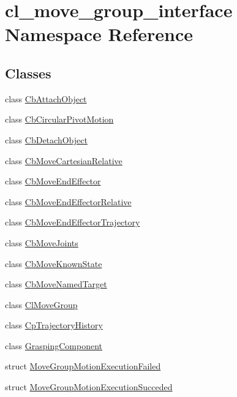 \hypertarget{namespacecl__move__group__interface}{}\section{cl\+\_\+move\+\_\+group\+\_\+interface Namespace Reference}
\label{namespacecl__move__group__interface}
\subsection*{Classes}
\begin{DoxyCompactItemize}
\item 
class \hyperlink{classcl__move__group__interface_1_1CbAttachObject}{Cb\+Attach\+Object}
\item 
class \hyperlink{classcl__move__group__interface_1_1CbCircularPivotMotion}{Cb\+Circular\+Pivot\+Motion}
\item 
class \hyperlink{classcl__move__group__interface_1_1CbDetachObject}{Cb\+Detach\+Object}
\item 
class \hyperlink{classcl__move__group__interface_1_1CbMoveCartesianRelative}{Cb\+Move\+Cartesian\+Relative}
\item 
class \hyperlink{classcl__move__group__interface_1_1CbMoveEndEffector}{Cb\+Move\+End\+Effector}
\item 
class \hyperlink{classcl__move__group__interface_1_1CbMoveEndEffectorRelative}{Cb\+Move\+End\+Effector\+Relative}
\item 
class \hyperlink{classcl__move__group__interface_1_1CbMoveEndEffectorTrajectory}{Cb\+Move\+End\+Effector\+Trajectory}
\item 
class \hyperlink{classcl__move__group__interface_1_1CbMoveJoints}{Cb\+Move\+Joints}
\item 
class \hyperlink{classcl__move__group__interface_1_1CbMoveKnownState}{Cb\+Move\+Known\+State}
\item 
class \hyperlink{classcl__move__group__interface_1_1CbMoveNamedTarget}{Cb\+Move\+Named\+Target}
\item 
class \hyperlink{classcl__move__group__interface_1_1ClMoveGroup}{Cl\+Move\+Group}
\item 
class \hyperlink{classcl__move__group__interface_1_1CpTrajectoryHistory}{Cp\+Trajectory\+History}
\item 
class \hyperlink{classcl__move__group__interface_1_1GraspingComponent}{Grasping\+Component}
\item 
struct \hyperlink{structcl__move__group__interface_1_1MoveGroupMotionExecutionFailed}{Move\+Group\+Motion\+Execution\+Failed}
\item 
struct \hyperlink{structcl__move__group__interface_1_1MoveGroupMotionExecutionSucceded}{Move\+Group\+Motion\+Execution\+Succeded}
\end{DoxyCompactItemize}
